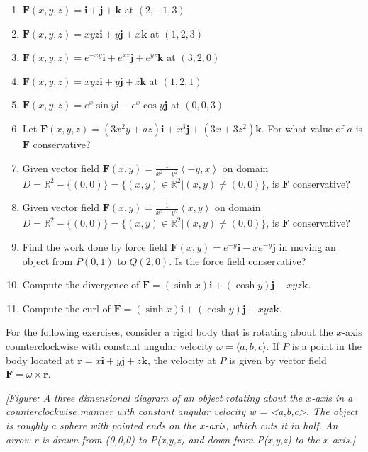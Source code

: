 \documentclass{exercises}
\begin{document}
\begin{enumerate}[resume]
\item $\mathbf{F}(x,y,z)=\mathbf{i}+\mathbf{j}+\mathbf{k}$ at $(2,-1,3)$
\item $\mathbf{F}(x,y,z)=xyz\mathbf{i}+y\mathbf{j}+x\mathbf{k}$ at $(1,2,3)$
\item $\mathbf{F}(x,y,z)=e^{-xy}\mathbf{i}+e^{xz}\mathbf{j}+e^{yz}\mathbf{k}$ at $(3,2,0)$
\item $\mathbf{F}(x,y,z)=xyz\mathbf{i}+y\mathbf{j}+z\mathbf{k}$ at $(1,2,1)$
\item $\mathbf{F}(x,y,z)=e^{x}\sin y\mathbf{i}-e^{x}\cos y\mathbf{j}$ at $(0,0,3)$
\item Let $\mathbf{F}(x,y,z)=(3x^{2}y+az)\mathbf{i}+x^{3}\mathbf{j}+(3x+3z^{2})\mathbf{k}$. For what value of $a$ is $\mathbf{F}$ conservative?
\item Given vector field $\mathbf{F}(x,y)=\frac{1}{x^{2}+y^{2}}\left\langle-y,x \right\rangle$ on domain $D=\mathbb{R}^{2}-\{(0,0)\}=\{(x,y)\in \mathbb{R}^{2}|(x,y)\ne(0,0)\}$, is $\mathbf{F}$ conservative?
\item Given vector field $\mathbf{F}(x,y)=\frac{1}{x^{2}+y^{2}}\left\langle x,y \right\rangle$ on domain $D=\mathbb{R}^{2}-\{(0,0)\}=\{(x,y)\in \mathbb{R}^{2}|(x,y)\ne(0,0)\}$, is $\mathbf{F}$ conservative?
\item Find the work done by force field $\mathbf{F}(x,y)=e^{-y}\mathbf{i}-xe^{-y}\mathbf{j}$ in moving an object from $P(0,1)$ to $Q(2,0)$. Is the force field conservative?
\item Compute the divergence of $\mathbf{F}=(\sinh x)\mathbf{i}+(\cosh y)\mathbf{j}-xyz\mathbf{k}$.
\item Compute the curl of $\mathbf{F}=(\sinh x)\mathbf{i}+(\cosh y)\mathbf{j}-xyz\mathbf{k}$.
\end{enumerate}

For the following exercises, consider a rigid body that is rotating about the $x$-axis counterclockwise with constant angular velocity $\omega=\langle a,b,c\rangle$. If $P$ is a point in the body located at $\mathbf{r}=x\mathbf{i}+y\mathbf{j}+z\mathbf{k}$, the velocity at $P$ is given by vector field $\mathbf{F}=\omega \times \mathbf{r}$.


\textit{[Figure: A three dimensional diagram of an object rotating about the $x$-axis in a counterclockwise manner with constant angular velocity w = <a,b,c>. The object is roughly a sphere with pointed ends on the $x$-axis, which cuts it in half. An arrow r is drawn from (0,0,0) to P(x,y,z) and down from P(x,y,z) to the $x$-axis.]}
\end{document}
